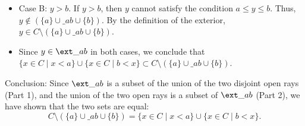 \documentclass[11pt]{article}
\begin{document}
\begin{lemma}
\begin{itemize}
        \item Case B: $y > b$.
        If $y > b$, then $y$ cannot satisfy the condition $a \le y \le b$. Thus, $y \notin (\{a\} \cup \_{ab}\cup \{b\})$. By the definition of the exterior, $y \in C \setminus (\{a\} \cup \_{ab}\cup \{b\})$.
        
        \item Since $y \in \ext\_{ab}$ in both cases, we conclude that $\{x \in C \mid x < a\} \cup \{x \in C \mid b < x\} \subset C \setminus (\{a\} \cup \_{ab}\cup \{b\})$.
    \end{itemize}
    
    Conclusion: Since $\ext\_{ab}$ is a subset of the union of the two disjoint open rays (Part 1), and the union of the two open rays is a subset of $\ext\_{ab}$ (Part 2), we have shown that the two sets are equal:
    \[
    C \setminus (\{a\} \cup \_{ab}\cup \{b\}) = \{x \in C \mid x < a\} \cup \{x \in C \mid b < x\}.
    \]
\end{lemma}
\end{document}
